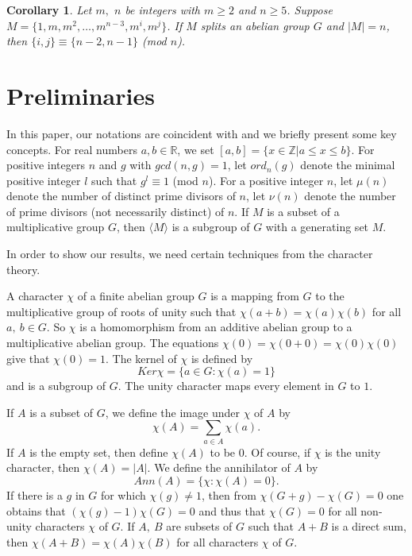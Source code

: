 \documentclass[preprint]{elsarticle}
\newtheorem{cor}[thm]{Corollary}
\begin{document}
\begin{cor} \label{thm5cor}
Let $m,$ $n$ be integers with $m\geq 2$ and $n\geq 5$.
Suppose $M=\{1,m,m^2,\ldots ,m^{n-3},m^i,m^j\}$.
If $M$ splits an abelian group $G$ and $|M|=n$, then $\{i,j\}\equiv \{n-2,n-1\}$ (mod $n$).
\end{cor}








\section{Preliminaries}

In this paper, our notations are coincident with \cite{[GS],[H],SS94,[SS]}
and we briefly present some key concepts.
For real numbers $a,b\in \mathbb{R}$, we set $[a,b] = \{x\in \mathbb{Z} | a\leq x\leq b\}$.
For positive integers $n$ and $g$ with $gcd(n,g)=1$,
let $ord_n(g)$ denote the minimal positive integer $l$ such that $g^l\equiv 1$ (mod $n$).
For a positive integer $n$, let $\mu(n)$ denote the number of distinct prime divisors of $n$,
let $\nu(n)$ denote the number of prime divisors (not necessarily distinct) of $n$.
If $M$ is a subset of a multiplicative group $G$, then $\langle M\rangle$ is a subgroup of $G$ with a generating set $M$.

In order to show our results, we need certain techniques from the character theory.


A character $\chi$ of a finite abelian group $G$ is a mapping from $G$ to the multiplicative group of roots of unity such that $\chi(a + b) = \chi(a)\chi(b)$ for all $a,\ b\in G$.
So $\chi$ is a homomorphism from an additive abelian group to a multiplicative abelian group.
The equations $\chi(0) = \chi(0 + 0) = \chi(0)\chi(0)$ give that $\chi(0) = 1$.
The kernel of $\chi$ is defined by $$Ker\chi = \{a\in G : \chi(a) = 1\}$$ and is a subgroup of $G$.
The unity character maps every element in $G$ to $1$.

If $A$ is a subset of $G$, we define the image under $\chi$ of $A$ by $$\chi(A) =\sum_{a\in A} \chi(a).$$
If $A$ is the empty set, then define $\chi(A)$ to be $0$.
Of course, if $\chi$ is the unity character, then $\chi(A) =|A|$.
We define the annihilator of $A$ by $$Ann(A) = \{\chi : \chi(A) = 0\}.$$
If there is a $g$ in $G$ for which $\chi(g)\neq 1$, then from $\chi(G + g)-\chi(G) = 0$ one obtains that $(\chi(g)-1)\chi(G) = 0$ and thus that $\chi(G) = 0$ for all non-unity characters $\chi$ of $G$.
If $A,\ B$ are subsets of $G$ such that $A + B$ is a direct sum, then $\chi(A + B) = \chi(A)\chi(B)$ for all characters $\chi$ of $G$.
\end{document}
